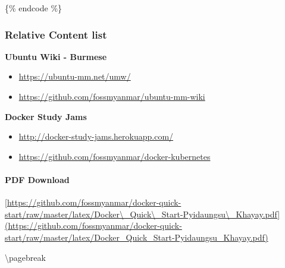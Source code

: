 \{\% endcode \%\}

\subsubsection{Relative Content list}\label{relative-content-list}

\textbf{Ubuntu Wiki - Burmese}

\begin{itemize}
\itemsep1pt\parskip0pt
\item
  \href{https://ubuntu-mm.net/umw/}{\url{https://ubuntu-mm.net/umw/}}\\
\item
  \href{https://github.com/fossmyanmar/ubuntu-mm-wiki}{\url{https://github.com/fossmyanmar/ubuntu-mm-wiki}}
\end{itemize}

\textbf{Docker Study Jams}

\begin{itemize}
\itemsep1pt\parskip0pt
\item
  \href{http://docker-study-jams.herokuapp.com/}{\url{http://docker-study-jams.herokuapp.com/}}\\
\item
  \href{https://github.com/fossmyanmar/docker-kubernetes}{\url{https://github.com/fossmyanmar/docker-kubernetes}}
\end{itemize}

\paragraph{PDF Download}\label{pdf-download}

\href{https://github.com/fossmyanmar/docker-quick-start/raw/master/latex/Docker_Quick_Start-Pyidaungsu_Khayay.pdf}{{[}https://github.com/fossmyanmar/docker-quick-start/raw/master/latex/Docker\textbackslash{}\_Quick\textbackslash{}\_Start-Pyidaungsu\textbackslash{}\_Khayay.pdf{]}(https://github.com/fossmyanmar/docker-quick-start/raw/master/latex/Docker\_Quick\_Start-Pyidaungsu\_Khayay.pdf)}

\textbackslash{}pagebreak

